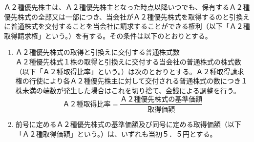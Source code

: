 \documentclass[10pt,a4paper,uplatex]{jsarticle}
\begin{document}
\term Ａ２種優先株主は、Ａ２種優先株主となった時点以降いつでも、保有するＡ２種優先株式の全部又は一部につき、当会社がＡ２種優先株式を取得するのと引換えに普通株式を交付することを当会社に請求することができる権利（以下「Ａ２種取得請求権」という。）を有する。その条件は以下のとおりとする。
\begin{enumerate}
  \item Ａ２種優先株式の取得と引換えに交付する普通株式数\\
  Ａ２種優先株式１株の取得と引換えに交付する当会社の普通株式の株式数（以下「Ａ２種取得比率」という。）は次のとおりとする。Ａ２種取得請求権の行使により各Ａ２種優先株主に対して交付される普通株式の数につき１株未満の端数が発生した場合はこれを切り捨て、金銭による調整を行う。
  \begin{displaymath}
  Ａ２種取得比率 = \frac{Ａ２種優先株式の基準価額}{取得価額}
  \end{displaymath}
  \item 前号に定めるＡ２種優先株式の基準価額及び同号に定める取得価額（以下「Ａ２種取得価額」という。）は、いずれも当初５．５円とする。
\end{enumerate}
\end{document}

